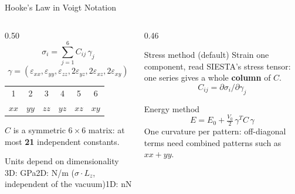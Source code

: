 \documentclass[8pt]{beamer}
\begin{document}
\begin{frame}{Hooke's Law in Voigt Notation}
	\begin{columns}[T]
		\begin{column}{0.50\textwidth}
			\[
				\sigma_i = \sum_{j=1}^{6} C_{ij}\,\gamma_j
			\]
			\[
				\gamma = (\varepsilon_{xx},\varepsilon_{yy},\varepsilon_{zz},
				2\varepsilon_{yz},2\varepsilon_{xz},2\varepsilon_{xy})
			\]
			\centering\small
			\begin{tabular}{cccccc}
				\toprule
				1 & 2 & 3 & 4 & 5 & 6 \\
				$xx$ & $yy$ & $zz$ & $yz$ & $xz$ & $xy$ \\
				\bottomrule
			\end{tabular}
			\par\vspace{0.2cm}\raggedright
			$C$ is a symmetric $6\times6$ matrix: at most \textbf{21} independent constants.
			\par\vspace{0.2cm}
			\begin{block}{Units depend on dimensionality}
				3D: GPa\quad 2D: N/m ($\sigma\cdot L_z$, independent of the vacuum)\quad 1D: nN
			\end{block}
		\end{column}
		\begin{column}{0.46\textwidth}
			\begin{block}{Stress method (default)}
				Strain one component, read SIESTA's stress tensor:
				one series gives a whole \textbf{column} of $C$.
				\[ C_{ij} = \partial\sigma_i/\partial\gamma_j \]
			\end{block}
			\begin{block}{Energy method}
				\[ E = E_0 + \tfrac{V_0}{2}\,\gamma^{T} C\,\gamma \]
				One curvature per pattern: off-diagonal terms need combined
				patterns such as $xx{+}yy$.
			\end{block}
		\end{column}
	\end{columns}
\end{frame}
\end{document}
